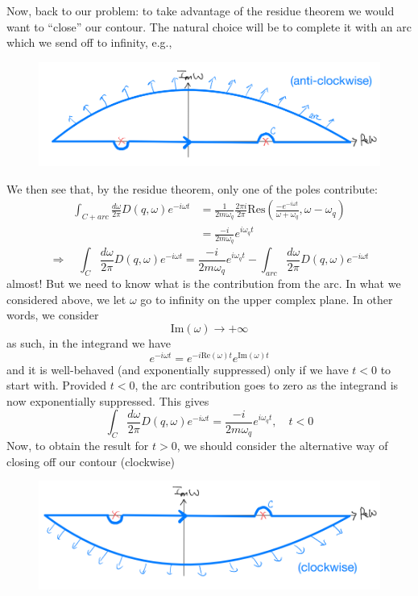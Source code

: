 Now, back to our problem: to take advantage of the residue theorem we would want to ``close'' our contour. The natural choice will be to complete it with an arc which we send off to infinity, e.g.,
\begin{figure}[ht]
    \centering
    \includegraphics[width=\textwidth]{jupyterbook/data/fig/lec12-fig03.png}
\end{figure}
We then see that, by the residue theorem, only one of the poles contribute:
\begin{align*}
    \int_{C+arc}{\frac{d\omega}{2\pi}D\left( q,\omega \right) e^{-i\omega t}}&=\frac{1}{2m\omega _q}\frac{2\pi i}{2\pi}\mathrm{Res}\left( \frac{-e^{-i\omega t}}{\omega +\omega _q},\omega -\omega _q \right) \\
    &=\frac{-i}{2m\omega _q}e^{i\omega _qt}
\end{align*}
\[ \Rightarrow \quad \int_C{\frac{d\omega}{2\pi}D\left( q,\omega \right) e^{-i\omega t}}=\frac{-i}{2m\omega _q}e^{i\omega _qt}-\int_{arc}{\frac{d\omega}{2\pi}D\left( q,\omega \right) e^{-i\omega t}}\]
almost! But we need to know what is the contribution from the arc. In what we considered above, we let $\omega$ go to infinity on the upper complex plane. In other words, we consider
\[ \mathrm{Im}\left( \omega \right) \rightarrow +\infty \]
as such, in the integrand we have
\[ e^{-i\omega t}=e^{-i\mathrm{Re}\left( \omega \right) t}e^{\mathrm{Im}\left( \omega \right) t}\]
and it is well-behaved (and exponentially suppressed) only if we have $t<0$ to start with. Provided $t<0$, the arc contribution goes to zero as the integrand is now exponentially suppressed. This gives
\[ \int_C{\frac{d\omega}{2\pi}D\left( q,\omega \right) e^{-i\omega t}}=\frac{-i}{2m\omega _q}e^{i\omega _qt},\quad t<0\]
Now, to obtain the result for $t>0$, we should consider the alternative way of closing off our contour (clockwise)
\begin{figure}[ht]
    \centering
    \includegraphics[width=\textwidth]{jupyterbook/data/fig/lec12-fig04.png}
\end{figure}
